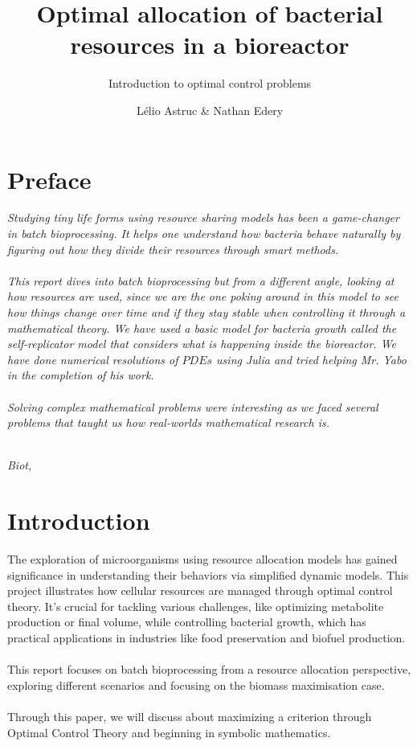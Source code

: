 \documentclass{tudelft-report}
\begin{document}
\frontmatter
\title{Optimal allocation of bacterial resources
in a bioreactor}
\subtitle{Introduction to optimal control problems}
\author{Lélio Astruc \& Nathan Edery}

\subject{MAM4 : Project report}
\makecover

\chapter*{Preface}

\emph{\indent Studying tiny life forms using resource sharing models has been a game-changer in batch bioprocessing. It helps one understand how bacteria behave naturally by figuring out how they divide their resources through smart methods. \\ \\
\indent This report dives into batch bioprocessing but from a different angle, looking at how resources are used, since we are the one poking around in this model to see how things change over time and if they stay stable when controlling it through a mathematical theory. We have used a basic model for bacteria growth called the self-replicator model that considers what is happening inside the bioreactor. We have done numerical resolutions of $PDEs$ using Julia and tried helping Mr. Yabo in the completion of his work.\\ \\
\indent Solving complex mathematical problems were interesting as we faced several problems that taught us how real-worlds mathematical research is.}

\begin{flushright}
{\makeatletter\itshape
    \@author \\
    Biot, \monthname{} \the\year{}
\makeatother}
\end{flushright}

\tableofcontents

\mainmatter

\chapter{Introduction}
\label{chapter:introduction}
The exploration of microorganisms using resource allocation models has gained significance in understanding their behaviors via simplified dynamic models. This project illustrates how cellular resources are managed through optimal control theory. It's crucial for tackling various challenges, like optimizing metabolite production or final volume, while controlling bacterial growth, which has practical applications in industries like food preservation and biofuel production. \\ \\
This report focuses on batch bioprocessing from a resource allocation perspective, exploring different scenarios and focusing on the biomass maximisation case.\\ \\
Through this paper, we will discuss about maximizing a criterion through Optimal Control Theory and beginning in symbolic mathematics.
\end{document}
